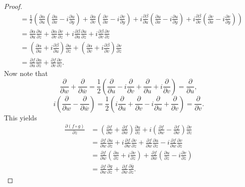 \documentclass[11pt, letterpaper]{article}
\theoremstyle{plain}
\begin{document}
\begin{proof}
\begin{align*}
						       &=\frac{1}{2} \left( \frac{\partial \alpha }{\partial u} \left( \frac{\partial u}{\partial x} -i \frac{\partial u}{\partial y}  \right) +\frac{\partial \alpha }{\partial v} \left( \frac{\partial v}{\partial x} -i \frac{\partial v}{\partial y}  \right) + i\frac{\partial \beta }{\partial u} \left( \frac{\partial u}{\partial x} -i \frac{\partial u}{\partial y}  \right) +i\frac{\partial \beta }{\partial v} \left( \frac{\partial v}{\partial x} -i \frac{\partial v}{\partial y}  \right)  \right) \\
						       &=\frac{\partial \alpha }{\partial u} \frac{\partial u}{\partial z} +\frac{\partial \alpha }{\partial v} \frac{\partial v}{\partial z} +i\frac{\partial \beta }{\partial u} \frac{\partial u}{\partial z} +i\frac{\partial \beta }{\partial v} \frac{\partial v}{\partial z} \\
						       &=\left( \frac{\partial \alpha }{\partial u} +i \frac{\partial \beta }{\partial u}  \right) \frac{\partial u}{\partial z} +\left( \frac{\partial \alpha }{\partial v} +i \frac{\partial \beta }{\partial v}  \right) \frac{\partial v}{\partial z} \\
						       &=\frac{\partial f}{\partial u} \frac{\partial u}{\partial z} +\frac{\partial f}{\partial v} \frac{\partial v}{\partial z} 
	.\end{align*}
	Now note that
	\[
		\frac{\partial }{\partial w} + \frac{\partial }{\partial \overline{w} } =\frac{1}{2} \left( \frac{\partial }{\partial u} -i \frac{\partial }{\partial v} +\frac{\partial }{\partial u} +i \frac{\partial }{\partial v}  \right) =\frac{\partial }{\partial u} 
	,\]
	\[
	i\left(\frac{\partial }{\partial w} -\frac{\partial }{\partial \overline{w} } \right)=\frac{1}{2} \left( i\frac{\partial }{\partial u} + \frac{\partial }{\partial v}-i\frac{\partial }{\partial u} + \frac{\partial }{\partial v} \right) =\frac{\partial }{\partial v} 
	.\]
	This yields
	\begin{align*}
		\frac{\partial (f\circ g)}{\partial z} &=\left( \frac{\partial f}{\partial w} +\frac{\partial f}{\partial \overline{w} }  \right) \frac{\partial u}{\partial z} + i\left( \frac{\partial f}{\partial w } -\frac{\partial f}{\partial \overline{w}}  \right) \frac{\partial v}{\partial z} \\
						       &=\frac{\partial f}{\partial w} \frac{\partial u}{\partial z} +i\frac{\partial f}{\partial w} \frac{\partial v}{\partial z} +\frac{\partial f}{\partial \overline{w} } \frac{\partial u}{\partial z} -i\frac{\partial f}{\partial \overline{w} } \frac{\partial v}{\partial z} \\
						       &=\frac{\partial f}{\partial w} \left( \frac{\partial u}{\partial z} +i \frac{\partial v}{\partial z}  \right) + \frac{\partial f}{\partial \overline{w} } \left( \frac{\partial u}{\partial z} -i \frac{\partial v}{\partial z}  \right) \\
						       &=\frac{\partial f}{\partial w} \frac{\partial g}{\partial z} + \frac{\partial f}{\partial \overline{w} } \frac{\partial \overline{g} }{\partial z } 
	.\end{align*}
	

\end{proof}
\end{document}
